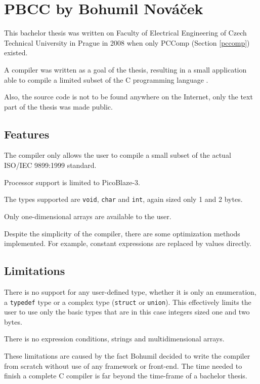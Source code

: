     \section{PBCC by Bohumil Nováček}\label{not_quite_c}

    This bachelor thesis was written on Faculty of Electrical Engineering of Czech Technical University in Prague in  2008 when only PCComp (Section \ref{pccomp}) existed.

    A compiler was written as a goal of the thesis, resulting in a small application able to compile a limited subset of the C programming language \cite{PbccNovacek}.

    Also, the source code is not to be found anywhere on the Internet, only the text part of the thesis was made public.

        \subsection{Features}

        The compiler only allows the user to compile a small subset of the actual ISO/IEC 9899:1999 standard.

        Processor support is limited to PicoBlaze-3.

        The types supported are \texttt{void}, \texttt{char} and \texttt{int}, again sized only 1 and 2 bytes.

        Only one-dimensional arrays are available to the user.

        Despite the simplicity of the compiler, there are some optimization methods implemented. For example, constant expressions are replaced by values directly.

        \subsection{Limitations}

        There is no support for any user-defined type, whether it is only an enumeration, a \texttt{typedef} type or a complex type (\texttt{struct} or \texttt{union}). This effectively limits the user to use only the basic types that are in this case integers sized one and two bytes.

        There is no expression conditions, strings and multidimensional arrays.

        These limitations are caused by the fact Bohumil decided to write the compiler
        from scratch without use of any framework or front-end. The time needed to finish a complete C compiler is far beyond the time-frame of a bachelor thesis.

